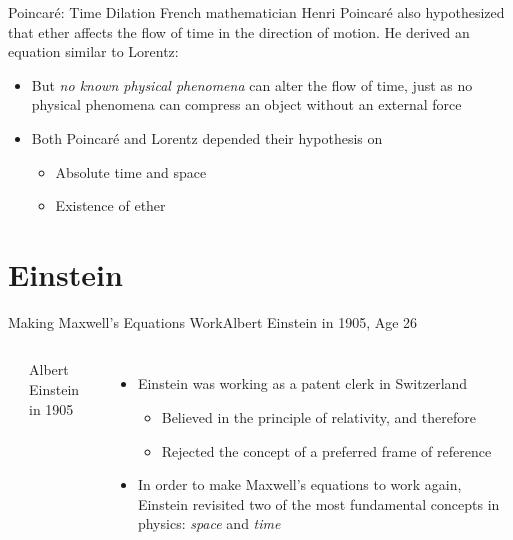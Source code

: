 \documentclass[12pt,compress,aspectratio=169]{beamer}
\newcommand{\bigsqrt}{\ensuremath\sqrt{1-\left(\dfrac vc\right)^2}}
\begin{document}
\begin{frame}{Poincar\'{e}: Time Dilation}
  French mathematician Henri Poincar\'{e} also hypothesized that ether affects
  the flow of time in the direction of motion. He derived an equation similar
  to Lorentz:

  \eq{-.1in}{
    \boxed{t'=\frac t{\bigsqrt}}
  }
 
  \begin{itemize}
  \item\vspace{-.1in}But \emph{no known physical phenomena} can alter the flow
    of time, just as no physical phenomena can compress an object without an
    external force
  \item Both Poincar\'{e} and Lorentz depended their hypothesis on
    \begin{itemize}
    \item Absolute time and space
    \item Existence of ether
    \end{itemize}
 \end{itemize}
\end{frame}



\section{Einstein}

\begin{frame}{Making Maxwell's Equations Work}{Albert Einstein in 1905, Age 26}
  \begin{columns}
    \centering
    \\
    {\scriptsize Albert Einstein in 1905\par}
        
    \begin{itemize}
    \item Einstein was working as a patent clerk in Switzerland
      \begin{itemize}
      \item Believed in the principle of relativity, and therefore
      \item Rejected the concept of a preferred frame of reference
      \end{itemize}
    \item In order to make Maxwell's equations to work again, Einstein
      revisited two of the most fundamental concepts in physics: \emph{space}
      and \emph{time}
    \end{itemize}
  \end{columns}
\end{frame}
\end{document}
